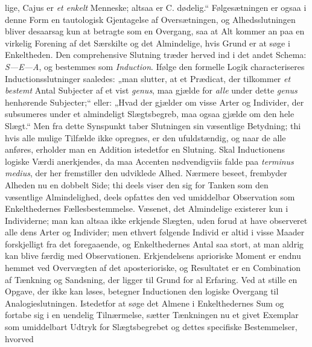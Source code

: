 \documentclass[12pt]{book}
\newcommand{\opage}[1]{\marginnote{\footnotesize\textit{[#1]}}}
\begin{document}
lige, Cajus er \emph{et enkelt} Menneske; altsaa er C. dødelig.“ Følgesætningen er
ogsaa i denne Form en tautologisk Gjentagelse af Oversætningen, og
Alhedsslutningen bliver desaarsag kun at betragte som en Overgang, saa at Alt
kommer an paa en virkelig Forening af det Særskilte og det Almindelige, hvis Grund
er at søge i Enkeltheden. Den comprehensive Slutning træder herved ind i det andet
Schema: \textit{S---E---A}, og bestemmes som \emph{Induction}. Ifølge den formelle
Logik characteriseres Inductionsslutninger saaledes: „man slutter, at et Prædicat,
der tilkommer \emph{et bestemt} Antal Subjecter af et vist \textit{genus}, maa
gjælde for \emph{alle} under dette \textit{genus} henhørende Subjecter;“ eller:
„Hvad der gjælder om visse Arter og Individer, der subsumeres under et almindeligt
Slægtsbegreb, maa ogsaa gjælde om den hele Slægt.“ Men fra dette Synspunkt taber
Slutningen sin væsentlige Betydning; thi hvis alle mulige Tilfælde ikke opregnes,
er den ufuldstændig, og naar de alle anføres, erholder man en Addition istedetfor
en Slutning. Skal Inductionens logiske Værdi anerkjendes, da maa Accenten
nødvendigviis falde paa \textit{terminus medius}, der her fremstiller den udviklede
Alhed. Nærmere beseet, frembyder Alheden nu en dobbelt Side; thi deels viser den
sig for Tanken som den væsentlige Almindelighed, deels opfattes den ved umiddelbar
Observation som Enkelthedernes Fællesbestemmelse. Væsenet, det Almindelige
existerer kun i Individerne; man kan altsaa ikke erkjende Slægten, uden forud at
have observeret alle dens Arter og Individer; men ethvert følgende Individ er altid
i visse Maader forskjelligt fra det foregaaende, og Enkelthedernes Antal saa stort,
at man aldrig kan blive færdig med Observationen. Erkjendelsens aprioriske Moment
er endnu hemmet ved Overvægten af det aposterioriske, og Resultatet er en
\opage{81} Combination af Tænkning og Sandsning, der ligger til Grund for al Erfaring. Ved at
stille en Opgave, der ikke kan løses, betegner Inductionen den logiske Overgang til
Analogieslutningen. Istedetfor at søge det Almene i Enkelthedernes Sum og fortabe
sig i en uendelig Tilnærmelse, sætter Tænkningen nu et givet Exemplar som
umiddelbart Udtryk for Slægtsbegrebet og dettes specifiske Bestemmelser, hvorved
\end{document}
